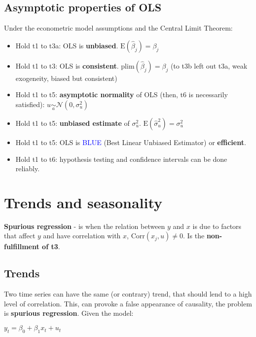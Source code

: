 \documentclass[10pt, a4paper, landscape]{article}
\newcommand{\E}{\mathrm{E}}
\newcommand{\Corr}{\mathrm{Corr}}
\begin{document}
\begin{multicols}{3}
		\subsection*{Asymptotic properties of OLS}
		
		Under the econometric model assumptions and the Central Limit Theorem:
		
		\begin{itemize}[leftmargin=*]
			\item Hold t1 to t3a: OLS is \textbf{unbiased}. $\E(\hat{\beta}_{j}) = \beta_{j}$
			\item Hold t1 to t3: OLS is \textbf{consistent}. $\mathrm{plim}(\hat{\beta}_{j}) = \beta_{j}$ (to t3b left out t3a, weak exogeneity, biased but consistent)
			\item Hold t1 to t5: \textbf{asymptotic normality} of OLS (then, t6 is necessarily satisfied): $u \underset{a}{\sim}\mathcal{N}(0, \sigma^{2}_{u})$
			\item Hold t1 to t5: \textbf{unbiased estimate} of $\sigma^{2}_{u}$. $\E(\hat{\sigma}^{2}_{u}) = \sigma^{2}_{u}$
			\item Hold t1 to t5: OLS is \textcolor{blue}{BLUE} (Best Linear Unbiased Estimator) or \textbf{efficient}.
			\item Hold t1 to t6: hypothesis testing and confidence intervals can be done reliably.
		\end{itemize}
		
		\columnbreak
		
		\section*{Trends and seasonality}
		
		\textbf{Spurious regression} - is when the relation between $y$ and $x$ is due to factors that affect $y$ and have correlation with $x$, $\Corr(x_{j}, u) \neq 0$. Is the \textbf{non-fulfillment of t3}.
		
		\subsection*{Trends}
		
		Two time series can have the same (or contrary) trend, that should lend to a high level of correlation. This, can provoke a false appearance of causality, the problem is \textbf{spurious regression}. Given the model:
		
		\begin{center}
			$y_{t} = \beta_{0} + \beta_{1} x_{t} + u_{t}$
		\end{center}
		

\end{multicols}
\end{document}
